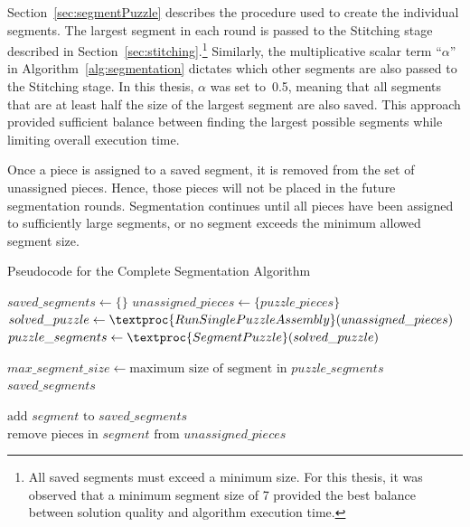 Section~\ref{sec:segmentPuzzle} describes the procedure used to create the individual segments. The largest segment in each round is passed to the Stitching stage described in Section~\ref{sec:stitching}.\footnote{All saved segments must exceed a minimum size.  For this thesis, it was observed that a minimum segment size of 7 provided the best balance between solution quality and algorithm execution time.} Similarly, the multiplicative scalar term ``\textit{$\alpha$}'' in Algorithm~\ref{alg:segmentation} dictates which other segments are also passed to the Stitching stage.  In this thesis, \textit{$\alpha$} was set to~0.5, meaning that all segments that are at least half the size of the largest segment are also saved.  This approach provided sufficient balance between finding the largest possible segments while limiting overall execution time.

Once a piece is assigned to a saved segment, it is removed from the set of unassigned pieces.  Hence, those pieces will not be placed in the future segmentation rounds.  Segmentation continues until all pieces have been assigned to sufficiently large segments, or no segment exceeds the minimum allowed segment size.

\begin{algorithm}[tb]
\caption{Pseudocode for the Complete Segmentation Algorithm}\label{alg:segmentation}
\begin{algorithmic}[1]
    \State $saved\_segments \gets \{ \}$
    \State $unassigned\_pieces \gets \{ puzzle\_pieces \}$
    \Loop
        \State $solved\_puzzle \gets \textproc{RunSinglePuzzleAssembly}(unassigned\_pieces)$
        \State $puzzle\_segments \gets \textproc{SegmentPuzzle}(solved\_puzzle)$
\item[]
        \State $max\_segment\_size \gets \text{maximum size of segment in } puzzle\_segments$
			\State \Return $saved\_segments$
        \EndIf
\item[]
                \State $\text{add } segment \text{ to } saved\_segments$
                \State $\text{remove pieces in } segment \text{ from } unassigned\_pieces$
            \EndIf
        \EndFor
	\EndLoop
\EndFunction
\end{algorithmic}
\end{algorithm}

